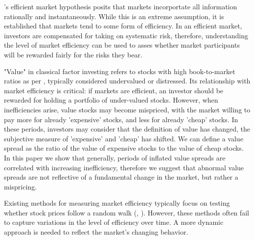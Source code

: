 
\indent \citet{fama_random_walk}'s efficient market hypothesis posits that markets incorportate all information rationally and instantaneously. While 
this is an extreme assumption, it is established that markets tend to some form of efficiency. %
In an efficient market, investors are compensated for taking on systematic risk, therefore, understanding the level of 
market efficiency can be used to asses whether market participants will be rewarded fairly for the risks they bear.

"Value" in classical factor investing refers to stocks with high book-to-market ratios as per \citet{fama_french_1993}, typically considered undervalued or distressed. 
Its relationship with market efficiency is critical: if markets are efficient, an investor should be rewarded for holding a portfolio of under-valued stocks. 
However, when inefficiencies arise, value stocks may become mispriced, with the market willing to pay more for already 'expensive' stocks, and
less for already 'cheap' stocks. In these periods, investors may consider that the definition of value has changed, the subjective measure of 
'expensive' and 'cheap' has shifted. We can define a value spread as the ratio of the value of expensive stocks to the value of cheap stocks.
In this paper we show that generally, periods of inflated value spreads are correlated with increasing inefficiency,
therefore we suggest that abnormal value spreads are not reflective of a fundamental change in the market, but rather a mispricing.

Existing methods for measuring market efficiency typically focus on testing whether stock prices follow a random walk
(\cite{fama_random_walk}, \cite{lim_brooks_2010}). However, these methods often fail to capture variations in the level of efficiency over time.
A more dynamic approach is needed to reflect the market’s changing behavior.

